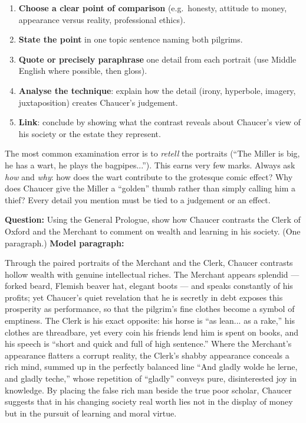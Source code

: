 \documentclass[11pt]{article}
\begin{document}
\begin{methode}
\begin{enumerate}
\item \textbf{Choose a clear point of comparison} (e.g.\ honesty, attitude to money, appearance versus reality, professional ethics).
\item \textbf{State the point} in one topic sentence naming both pilgrims.
\item \textbf{Quote or precisely paraphrase} one detail from each portrait (use Middle English where possible, then gloss).
\item \textbf{Analyse the technique}: explain how the detail (irony, hyperbole, imagery, juxtaposition) creates Chaucer's judgement.
\item \textbf{Link}: conclude by showing what the contrast reveals about Chaucer's view of his society or the estate they represent.
\end{enumerate}
\end{methode}

\begin{attention}
The most common examination error is to \emph{retell} the portraits (``The Miller is big, he has a wart, he plays the bagpipes...''). This earns very few marks. Always ask \emph{how} and \emph{why}: how does the wart contribute to the grotesque comic effect? Why does Chaucer give the Miller a ``golden'' thumb rather than simply calling him a thief? Every detail you mention must be tied to a judgement or an effect.
\end{attention}

\begin{exoresolu}
\textbf{Question:} Using the General Prologue, show how Chaucer contrasts the Clerk of Oxford and the Merchant to comment on wealth and learning in his society. (One paragraph.)
\tcblower
\textbf{Model paragraph:}\par
Through the paired portraits of the Merchant and the Clerk, Chaucer contrasts hollow wealth with genuine intellectual riches. The Merchant appears splendid — forked beard, Flemish beaver hat, elegant boots — and speaks constantly of his profits; yet Chaucer's quiet revelation that he is secretly in debt exposes this prosperity as performance, so that the pilgrim's fine clothes become a symbol of emptiness. The Clerk is his exact opposite: his horse is ``as lean... as a rake,'' his clothes are threadbare, yet every coin his friends lend him is spent on books, and his speech is ``short and quick and full of high sentence.'' Where the Merchant's appearance flatters a corrupt reality, the Clerk's shabby appearance conceals a rich mind, summed up in the perfectly balanced line ``And gladly wolde he lerne, and gladly teche,'' whose repetition of ``gladly'' conveys pure, disinterested joy in knowledge. By placing the false rich man beside the true poor scholar, Chaucer suggests that in his changing society real worth lies not in the display of money but in the pursuit of learning and moral virtue.
\end{exoresolu}
\end{document}
